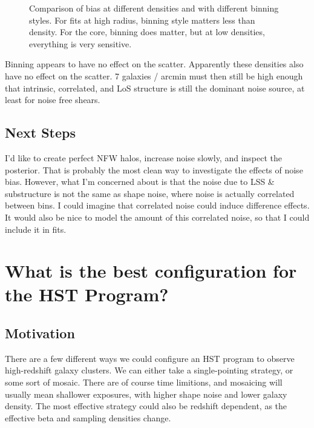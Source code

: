 \documentclass[11pt]{article}
\begin{document}
\begin{figure}
\caption{Comparison of bias at different densities and with different binning styles. For fits at high radius, binning style matters less than density. For the core, binning does matter, but at low densities, everything is very sensitive.}
\label{fig:density_binning_bias}
\end{figure}


Binning appears to have no effect on the scatter. Apparently these densities also have no effect on the scatter. 7 galaxies / arcmin must then still be high enough that intrinsic, correlated, and LoS structure is still the dominant noise source, at least for noise free shears.





\subsection{Next Steps}

I'd like to create perfect NFW halos, increase noise slowly, and inspect the posterior. That is probably the most clean way to investigate the effects of noise bias. However, what I'm concerned about is that the noise due to LSS \& substructure is not the same as shape noise, where noise is actually correlated between bins. I could imagine that correlated noise could induce difference effects. It would also be nice to model the amount of this correlated noise, so that I could include it in fits. 

\clearpage \newpage

\section{What is the best configuration for the HST Program?}
\label{sec:hstproposal}


\subsection{Motivation}
There are a few different ways we could configure an HST program to observe high-redshift galaxy clusters. We can either take a single-pointing strategy, or some sort of mosaic. There are of course time limitions, and mosaicing will usually mean shallower exposures, with higher shape noise and lower galaxy density. The most effective strategy could also be redshift dependent, as the effective beta and sampling densities change.
\end{document}

